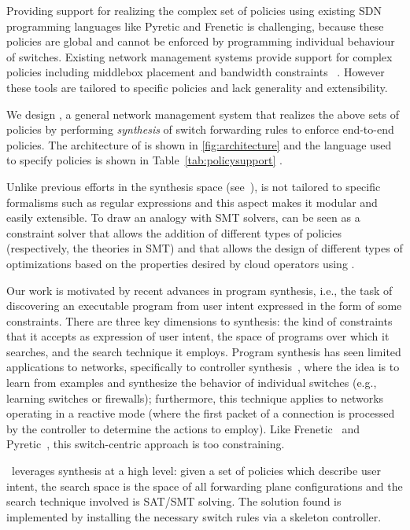 


Providing support for realizing the complex set of policies using
existing SDN programming languages like Pyretic and Frenetic is
challenging, because these policies are global and cannot be enforced
by programming individual behaviour of switches. Existing network
management systems provide support for complex policies including
middlebox placement and bandwidth constraints~\cite{} . 
However these tools
are tailored to specific policies and lack generality and
extensibility.

We design \name, a general network management system that realizes the above
sets of policies by performing {\em synthesis} of switch forwarding
rules to enforce end-to-end policies. The architecture of \name
is shown in \cref{fig:architecture} and the 
language used to specify policies
is shown in
Table~\ref{tab:policysupport} .

Unlike previous efforts in the synthesis space (see~\cite{netgen,merlin}), \Name is
not tailored to specific formalisms such as regular expressions and
this aspect makes it modular and easily extensible.
To draw an analogy with SMT solvers, \Name can be seen as a constraint
solver that allows the addition of different types of policies
(respectively, the theories in SMT) and that allows the design of
different types of optimizations based on the properties desired by cloud
  operators using \Name. 
  
Our work is motivated by recent advances in program synthesis, i.e.,
the task of discovering an executable
program from user intent expressed in the form of some
constraints. There are three key dimensions to synthesis: the kind of
constraints that it accepts as expression of user intent, the space of
programs over which it searches, and the search technique it
employs. Program synthesis has seen limited applications to networks,
specifically to controller synthesis~\cite{netegg}, where the idea is
to learn from examples and synthesize the behavior of individual
switches (e.g., learning switches or firewalls); furthermore, this
technique applies to networks operating in a reactive mode (where the
first packet of a connection is processed by the controller to
determine the actions to employ). Like Frenetic~\cite{frenetic} and
Pyretic~\cite{pyretic}, this switch-centric approach is too constraining.

\Name\ leverages synthesis at a high level: given a set of
policies which describe user intent, the search space is the space of
all forwarding plane configurations and the search technique involved
is SAT/SMT solving. The solution found is implemented by installing
the necessary switch rules via a skeleton controller.

